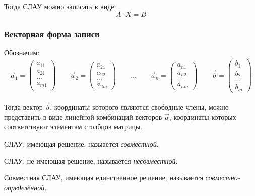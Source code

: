 Тогда СЛАУ можно записать в виде: \[
  \boxed{A \cdot X = B}
\] 

\subsubsection*{Векторная форма записи}

Обозначим:
\begin{gather*}
  \vec{a}_1 = \left( 
    \begin{matrix}
      a_{11} \\
      a_{21} \\
      \ldots \\
      a_{m1} \\
    \end{matrix}
  \right) \qquad
  \vec{a}_2 = \left( 
    \begin{matrix}
      a_{21} \\
      a_{22} \\
      \ldots \\
      a_{2m}
    \end{matrix}
  \right) \qquad \ldots \qquad 
  \vec{a}_n = \left( 
    \begin{matrix}
      a_{n1} \\
      a_{n2} \\
      \ldots \\
      a_{nm}
    \end{matrix}
  \right) \qquad 
  \vec{b} = \left( 
    \begin{matrix}
      b_1 \\ 
      b_2 \\
      \ldots \\
      b_m
    \end{matrix}
  \right)
\end{gather*}

Тогда вектор $\vec{b}$, координаты которого являются свободные члены, можно представить в виде линейной комбинаций векторов $\vec{a}$, координаты которых соответствуют элементам столбцов матрицы.

\begin{definition}
  СЛАУ, имеющая решение, назыается \textit{совместной}.
\end{definition}

\begin{definition}
  СЛАУ, не имеющая решение, называется \textit{несовместной}.  
\end{definition}

\begin{definition}
  Совместная СЛАУ, имеющая единственное решение, называется \textit{совместно-определённой}. 
\end{definition}

